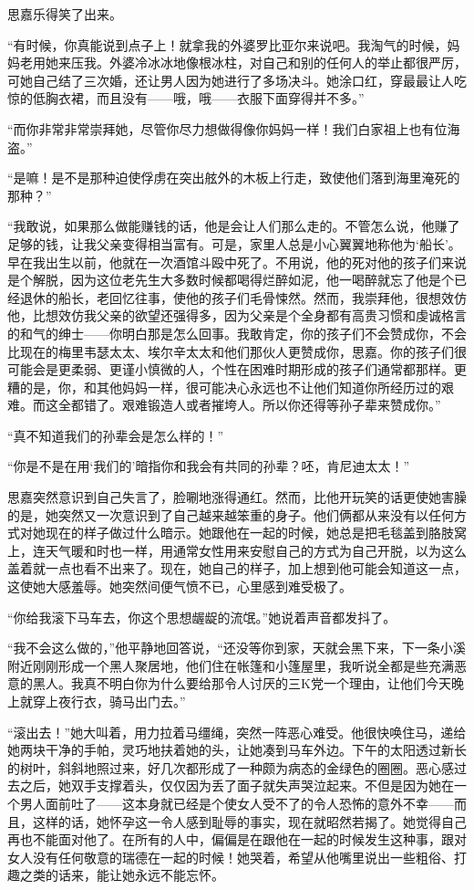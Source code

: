 \par 思嘉乐得笑了出来。
\par “有时候，你真能说到点子上！就拿我的外婆罗比亚尔来说吧。我淘气的时候，妈妈老用她来压我。外婆冷冰冰地像根冰柱，对自己和别的任何人的举止都很严厉，可她自己结了三次婚，还让男人因为她进行了多场决斗。她涂口红，穿最最让人吃惊的低胸衣裙，而且没有——哦，哦——衣服下面穿得并不多。”
\par “而你非常非常崇拜她，尽管你尽力想做得像你妈妈一样！我们白家祖上也有位海盗。”
\par “是嘛！是不是那种迫使俘虏在突出舷外的木板上行走，致使他们落到海里淹死的那种？”
\par “我敢说，如果那么做能赚钱的话，他是会让人们那么走的。不管怎么说，他赚了足够的钱，让我父亲变得相当富有。可是，家里人总是小心翼翼地称他为‘船长’。早在我出生以前，他就在一次酒馆斗殴中死了。不用说，他的死对他的孩子们来说是个解脱，因为这位老先生大多数时候都喝得烂醉如泥，他一喝醉就忘了他是个已经退休的船长，老回忆往事，使他的孩子们毛骨悚然。然而，我崇拜他，很想效仿他，比想效仿我父亲的欲望还强得多，因为父亲是个全身都有高贵习惯和虔诚格言的和气的绅士——你明白那是怎么回事。我敢肯定，你的孩子们不会赞成你，不会比现在的梅里韦瑟太太、埃尔辛太太和他们那伙人更赞成你，思嘉。你的孩子们很可能会是更柔弱、更谨小慎微的人，个性在困难时期形成的孩子们通常都那样。更糟的是，你，和其他妈妈一样，很可能决心永远也不让他们知道你所经历过的艰难。而这全都错了。艰难锻造人或者摧垮人。所以你还得等孙子辈来赞成你。”
\par “真不知道我们的孙辈会是怎么样的！”
\par “你是不是在用‘我们的’暗指你和我会有共同的孙辈？呸，肯尼迪太太！”
\par 思嘉突然意识到自己失言了，脸唰地涨得通红。然而，比他开玩笑的话更使她害臊的是，她突然又一次意识到了自己越来越笨重的身子。他们俩都从来没有以任何方式对她现在的样子做过什么暗示。她跟他在一起的时候，她总是把毛毯盖到胳肢窝上，连天气暖和时也一样，用通常女性用来安慰自己的方式为自己开脱，以为这么盖着就一点也看不出来了。现在，她自己的样子，加上想到他可能会知道这一点，这使她大感羞辱。她突然间便气愤不已，心里感到难受极了。
\par “你给我滚下马车去，你这个思想龌龊的流氓。”她说着声音都发抖了。
\par “我不会这么做的，”他平静地回答说，“还没等你到家，天就会黑下来，下一条小溪附近刚刚形成一个黑人聚居地，他们住在帐篷和小篷屋里，我听说全都是些充满恶意的黑人。我真不明白你为什么要给那令人讨厌的三K党一个理由，让他们今天晚上就穿上夜行衣，骑马出门去。”
\par “滚出去！”她大叫着，用力拉着马缰绳，突然一阵恶心难受。他很快唤住马，递给她两块干净的手帕，灵巧地扶着她的头，让她凑到马车外边。下午的太阳透过新长的树叶，斜斜地照过来，好几次都形成了一种颇为病态的金绿色的圈圈。恶心感过去之后，她双手支撑着头，仅仅因为丢了面子就失声哭泣起来。不但是因为她在一个男人面前吐了——这本身就已经是个使女人受不了的令人恐怖的意外不幸——而且，这样的话，她怀孕这一令人感到耻辱的事实，现在就昭然若揭了。她觉得自己再也不能面对他了。在所有的人中，偏偏是在跟他在一起的时候发生这种事，跟对女人没有任何敬意的瑞德在一起的时候！她哭着，希望从他嘴里说出一些粗俗、打趣之类的话来，能让她永远不能忘怀。
